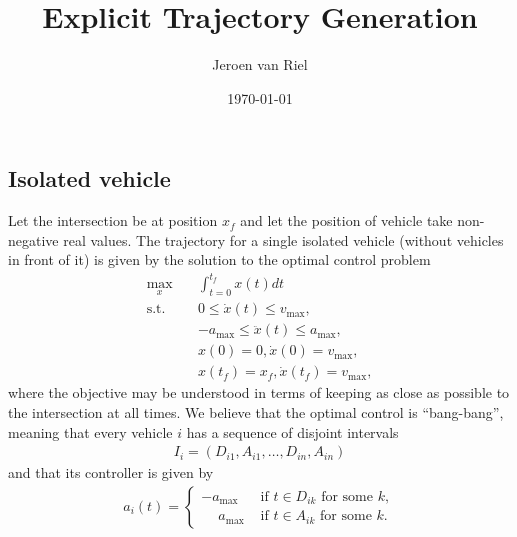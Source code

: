 \documentclass[a4paper]{article}
\author{Jeroen van Riel}
\date{\monthyeardate\today}
\title{Explicit Trajectory Generation}
\theoremstyle{definition}
\theoremstyle{plain}
\begin{document}
\subsection*{Isolated vehicle}

Let the intersection be at position $x_{f}$ and let the position of vehicle take
non-negative real values. The trajectory for a single isolated vehicle (without
vehicles in front of it) is given by the solution to the optimal control problem
\begin{align*}
  \max_{x}    \quad & \int_{t=0}^{t_{f}} x(t) dt \\
  \text{s.t.} \quad & 0 \leq \dot{x}(t) \leq v_{\max} , \\
                    & {-a_{\max}} \leq \ddot{x}(t) \leq a_{\max} , \\
                    & x(0) = 0 , \dot{x}(0) = v_{\max} , \\
                    & x(t_{f}) = x_{f} , \dot{x}(t_{f}) = v_{\max} ,
\end{align*}
where the objective may be understood in terms of keeping as close as possible
to the intersection at all times.
%
We believe that the optimal control is ``bang-bang'', meaning that every vehicle $i$ has a sequence of disjoint intervals
\begin{align*}
  I_{i} = (D_{i1}, A_{i1}, \dots, D_{in}, A_{in})
\end{align*}
and that its controller is given by
\begin{align*}
  a_{i}(t) = \begin{cases}
           {-a_{\max}} &\text{ if } t \in D_{ik} \text{ for some } k , \\
           \phantom{-} a_{\max}   &\text{ if } t \in A_{ik} \text{ for some } k .
         \end{cases}
\end{align*}
\end{document}
